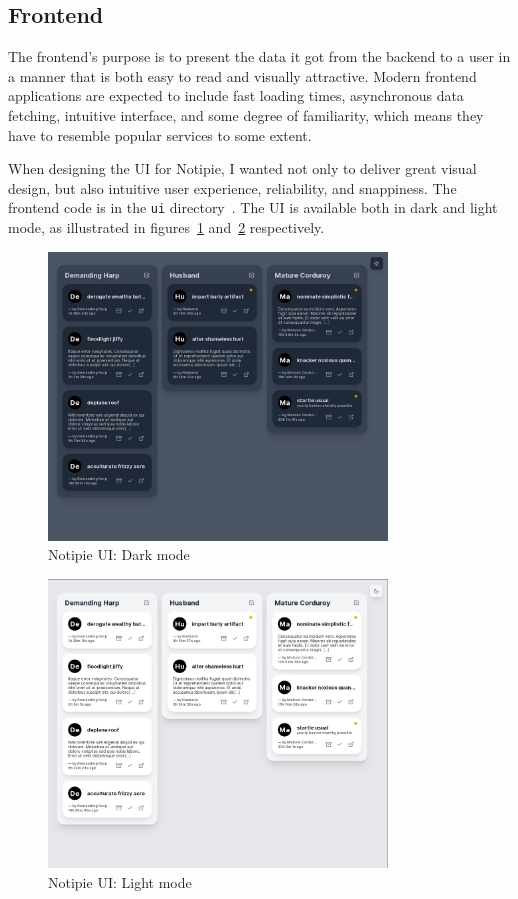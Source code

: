 \subsection{Frontend}\label{sec:frontend}

The frontend's purpose is to present the data
it got from the backend to a user
in a manner that is both easy to read
and visually attractive.
Modern frontend applications
are expected to include
fast loading times,
asynchronous data fetching,
intuitive interface,
and some degree of familiarity,
which means they have to resemble
popular services to some extent.

When designing the \ac{UI} for Notipie,
I wanted not only to deliver great visual design,
but also intuitive user experience,
reliability,
and snappiness.
The frontend code
is in the
\texttt{ui} directory~\cite{sewera_notipie_2022-5}.
The \ac{UI} is available both in dark and light mode,
as illustrated in figures~\ref{fig:notipie-ui-dark}
and~\ref{fig:notipie-ui-light} respectively.

\begin{figure}[h]
  \centering
  \includegraphics[width=9cm,keepaspectratio]{img/notipie_dark.jpg}
  \caption{Notipie UI: Dark mode}
  \label{fig:notipie-ui-dark}
\end{figure}

\begin{figure}[h]
  \centering
  \includegraphics[width=9cm,keepaspectratio]{img/notipie_light.jpg}
  \caption{Notipie UI: Light mode}
  \label{fig:notipie-ui-light}
\end{figure}

